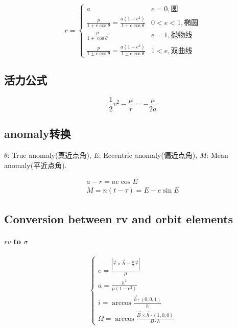 \documentclass[UTF8]{ctexart}
\begin{document}
\begin{equation}
	r=
	\begin{cases}
		a & e=0,\text{圆}\\
		\frac{p}{1+e\cos\theta}=\frac{a(1-e^2)}{1+e\cos\theta} & 0<e<1,\text{椭圆}\\
		\frac{p}{1+\cos\theta} & e=1,\text{抛物线}\\
		\frac{p}{1\pm e\cos\theta}=\frac{a(1-e^2)}{1\pm e\cos\theta} & 1<e,\text{双曲线}
	\end{cases}
\end{equation}

\subsection{活力公式}
\begin{equation}
	\frac{1}{2}v^2-\frac{\mu}{r}=-\frac{\mu}{2a}
\end{equation}

\subsection{anomaly转换}

$\theta$: True anomaly(真近点角), $E$: Eccentric anomaly(偏近点角), $M$: Mean anomaly(平近点角).

\begin{gather}
	a-r=ae\cos E\\
	M=n(t-\tau)=E-e\sin E
\end{gather}

\subsection{Conversion between rv and orbit elements}
\paragraph{$rv$ to $\sigma$}
\begin{equation}
	\begin{cases}
		e=\frac{|\dot{\vec{r}}\times\vec{h}-\frac{\mu}{r}\vec{r}|}{\mu}\\
		a=\frac{h^2}{\mu(1-e^2)}\\
		i=\arccos{\frac{\vec{h}\cdot(0,0,1)}{h}}\\
		\Omega=\arccos\frac{\vec{B}\times\vec{h}\cdot(1,0,0)}{B\cdot h}
	\end{cases}
\end{equation}


\end{document}
